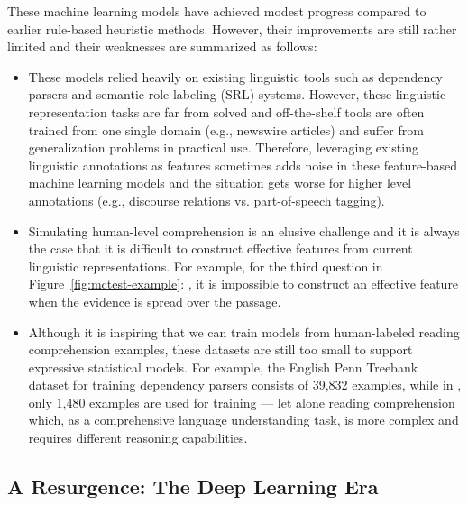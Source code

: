 These machine learning models have achieved modest progress compared to earlier rule-based heuristic methods. However, their improvements are still rather limited and their weaknesses are summarized as follows:
\begin{itemize}
    \item
        These models relied heavily on existing linguistic tools such as dependency parsers and semantic role labeling (SRL) systems. However, these linguistic representation tasks are far from solved and off-the-shelf tools are often trained from one single domain (e.g., newswire articles) and suffer from generalization problems in practical use. Therefore, leveraging existing linguistic annotations as features sometimes adds noise in these feature-based machine learning models and the situation gets worse for higher level annotations (e.g., discourse relations vs. part-of-speech tagging).
    \item
        Simulating human-level comprehension is an elusive challenge and it is always the case that it is difficult to construct effective features from current linguistic representations. For example, for the third question in Figure~\ref{fig:mctest-example}: , it is impossible to construct an effective feature when the evidence is spread over the passage.
    \item
        Although it is inspiring that we can train models from human-labeled reading comprehension examples, these datasets are still too small to support expressive statistical models. For example, the English Penn Treebank dataset for training dependency parsers consists of 39,832 examples, while in , only 1,480 examples are used for training --- let alone reading comprehension which, as a comprehensive language understanding task, is more complex and requires different reasoning capabilities.
\end{itemize}

\subsection{A Resurgence: The Deep Learning Era}
\label{sec:deep-learning-era}

